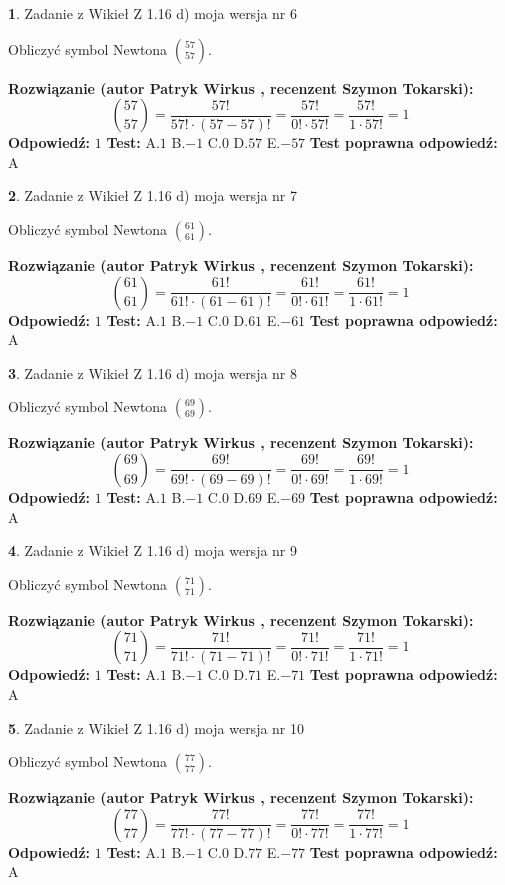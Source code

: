 \documentclass[12pt, a4paper]{article}
\theoremstyle{definition} %
\newtheorem{zad}{}
\newcommand{\zadStart}[1]{\begin{zad}#1\newline}
\newcommand{\zadStop}{\end{zad}}
\newcommand{\rozwStart}[2]{\noindent \textbf{Rozwiązanie (autor #1 , recenzent #2): }\newline}
\newcommand{\rozwStop}{\newline}
\newcommand{\odpStart}{\noindent \textbf{Odpowiedź:}\newline}
\newcommand{\odpStop}{\newline}
\newcommand{\testStart}{\noindent \textbf{Test:}\newline}
\newcommand{\testStop}{\newline}
\newcommand{\kluczStart}{\noindent \textbf{Test poprawna odpowiedź:}\newline}
\newcommand{\kluczStop}{\newline}
\begin{document}
\zadStart{Zadanie z Wikieł Z 1.16 d) moja wersja nr 6}

Obliczyć symbol Newtona ${57 \choose 57}$.
\zadStop
\rozwStart{Patryk Wirkus}{Szymon Tokarski}
$${57 \choose 57} = \frac{57!}{57! \cdot (57-57)!} = \frac{57!}{0! \cdot 57!} = \frac{57!}{1 \cdot 57!} = 1$$
\rozwStop
\odpStart
$1$
\odpStop
\testStart
A.$1$ B.$-1$ C.$0$ D.$57$ E.$-57$
\testStop
\kluczStart
A
\kluczStop



\zadStart{Zadanie z Wikieł Z 1.16 d) moja wersja nr 7}

Obliczyć symbol Newtona ${61 \choose 61}$.
\zadStop
\rozwStart{Patryk Wirkus}{Szymon Tokarski}
$${61 \choose 61} = \frac{61!}{61! \cdot (61-61)!} = \frac{61!}{0! \cdot 61!} = \frac{61!}{1 \cdot 61!} = 1$$
\rozwStop
\odpStart
$1$
\odpStop
\testStart
A.$1$ B.$-1$ C.$0$ D.$61$ E.$-61$
\testStop
\kluczStart
A
\kluczStop



\zadStart{Zadanie z Wikieł Z 1.16 d) moja wersja nr 8}

Obliczyć symbol Newtona ${69 \choose 69}$.
\zadStop
\rozwStart{Patryk Wirkus}{Szymon Tokarski}
$${69 \choose 69} = \frac{69!}{69! \cdot (69-69)!} = \frac{69!}{0! \cdot 69!} = \frac{69!}{1 \cdot 69!} = 1$$
\rozwStop
\odpStart
$1$
\odpStop
\testStart
A.$1$ B.$-1$ C.$0$ D.$69$ E.$-69$
\testStop
\kluczStart
A
\kluczStop



\zadStart{Zadanie z Wikieł Z 1.16 d) moja wersja nr 9}

Obliczyć symbol Newtona ${71 \choose 71}$.
\zadStop
\rozwStart{Patryk Wirkus}{Szymon Tokarski}
$${71 \choose 71} = \frac{71!}{71! \cdot (71-71)!} = \frac{71!}{0! \cdot 71!} = \frac{71!}{1 \cdot 71!} = 1$$
\rozwStop
\odpStart
$1$
\odpStop
\testStart
A.$1$ B.$-1$ C.$0$ D.$71$ E.$-71$
\testStop
\kluczStart
A
\kluczStop



\zadStart{Zadanie z Wikieł Z 1.16 d) moja wersja nr 10}

Obliczyć symbol Newtona ${77 \choose 77}$.
\zadStop
\rozwStart{Patryk Wirkus}{Szymon Tokarski}
$${77 \choose 77} = \frac{77!}{77! \cdot (77-77)!} = \frac{77!}{0! \cdot 77!} = \frac{77!}{1 \cdot 77!} = 1$$
\rozwStop
\odpStart
$1$
\odpStop
\testStart
A.$1$ B.$-1$ C.$0$ D.$77$ E.$-77$
\testStop
\kluczStart
A
\kluczStop
\end{document}
